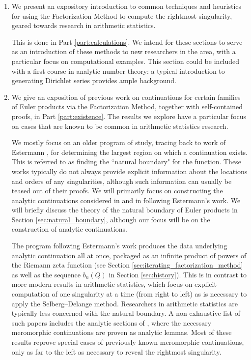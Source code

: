 \documentclass[12pt]{amsart}
\theoremstyle{plain}
\begin{document}
\begin{enumerate}[1)]
    \item We present an expository introduction to common techniques and heuristics for using the Factorization Method to compute the rightmost singularity, geared towards research in arithmetic statistics.
    
    This is done in Part \ref{part:calculations}. We intend for these sections to serve as an introduction of these methods to new researchers in the area, with a particular focus on computational examples. This section could be included with a first course in analytic number theory: a typical introduction to generating Dirichlet series provides ample background.
    
    \item We give an exposition of previous work on continuations for certain families of Euler products via the Factorization Method, together with self-contained proofs, in Part \ref{part:existence}. The results we explore have a particular focus on cases that are known to be common in arithmetic statistics research.

    We mostly focus on an older program of study, tracing back to work of Estermann \cite{estermann_1928}, for determining the largest region on which a continuation exists. This is referred to as finding the ``natural boundary" for the function. These works typically do not always provide explicit information about the locations and orders of any singularities, although such information can usually be teased out of their proofs. We will primarily focus on constructing the analytic continuations considered in \cite{estermann_1928} and in \cite{dahlquist_1952, kurokawa_1978, kurokawa_1986I, kurokawa_1986II, landau_walfisz_1920, moroz_1988} following Estermann's work. We will briefly discuss the theory of the natural boundary of Euler products in Section \ref{sec:natural_boundary}, although our focus will be on the construction of analytic continuations.
    
    The program following Estermann's work produces the data underlying analytic continuation all at once, packaged as an infinite product of powers of the Riemann zeta function (see Section \ref{sec:iterating_factorization_method} as well as the sequence $b_n(Q)$ in Section \ref{sec:history}). This is in contrast to more modern results in arithmetic statistics, which focus on explicit computation of one singularity at a time (from right to left) as is necessary to apply the Selberg--Delange method. Researchers in arithmetic statistics are typically less concerned with the natural boundary. A non-exhaustive list of such papers includes the analytic sections of \cite{alberts2021,frei-loughran-newton2019,kaplan-marcinek-takloo-bighash2015,wood2009}, where the necessary meromorphic continuations are proven as analytic lemmas. Most of these results reprove special cases of previously known meromorphic continuations, only as far to the left as necessary to reveal the rightmost singularity.


\end{enumerate}
\end{document}
